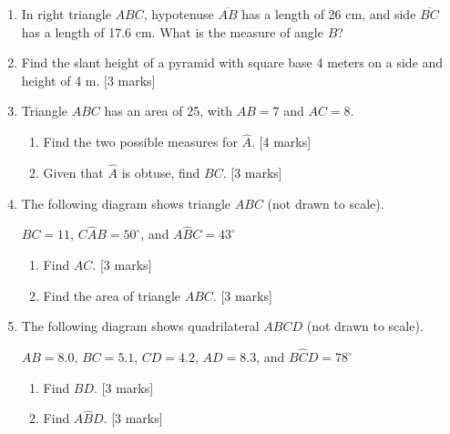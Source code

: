 \documentclass[12pt, twoside]{article}
\begin{document}
\begin{enumerate}
\item In right triangle $ABC$, hypotenuse $\overline{AB}$ has a length of 26 cm, and side $\overline{BC}$ has a length of 17.6 cm. What is the measure of angle $B$?
   
\item Find the slant height of a pyramid with square base 4 meters on a side and height of 4 m. \hfill [3 marks]
    
\item Triangle $ABC$ has an area of 25, with $AB=7$ and $AC=8$. 
   \begin{enumerate}
     \item Find the two possible measures for $\hat{A}$. \hfill [4 marks]
     \item Given that $\hat{A}$ is obtuse, find $BC$. \hfill [3 marks]
   \end{enumerate}

   \newpage

\item The following diagram shows triangle $ABC$ (not drawn to scale).
  \begin{center}
    \end{center} 
    $BC=11$, $C\hat{A}B=50^\circ$, and $A\hat{B}C=43^\circ$
    \begin{enumerate}
      \item Find $AC$. \hfill [3 marks]
      \item Find the area of triangle $ABC$. \hfill [3 marks]
    \end{enumerate}

\item The following diagram shows quadrilateral $ABCD$ (not drawn to scale).
  \begin{center}
    \end{center} 
    $AB=8.0$, $BC=5.1$, $CD=4.2$, $AD=8.3$, and $B\hat{C}D=78^\circ$
    \begin{enumerate}
      \item Find $BD$. \hfill [3 marks]
      \item Find $A\hat{B}D$. \hfill [3 marks]
    \end{enumerate}


\end{enumerate}
\end{document}
